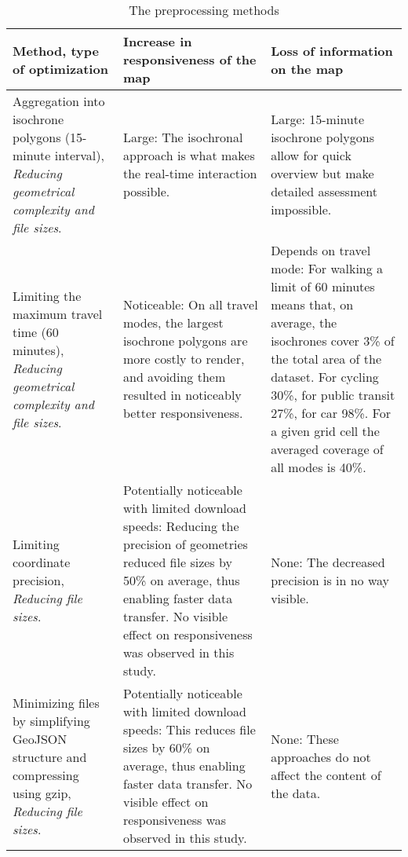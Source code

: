 \begin{table}[H]
	\caption{The preprocessing methods}
	\label{tab:preprocessing methods}
	\centering
	\begin{tabular}{ | L{0.25\textwidth} | L{0.33\textwidth} | L{0.33\textwidth} | }
		\hline
		\textbf{Method, type of optimization}
		& \textbf{Increase in responsiveness of the map}
		& \textbf{Loss of information on the map}
		\\
		\hline
		\hline
		Aggregation into isochrone polygons (15-minute interval),
		\textit{Reducing geometrical complexity and file sizes}.
		& Large: The isochronal approach is what makes the real-time interaction possible.
		& Large: 15-minute isochrone polygons allow for quick overview but make detailed assessment impossible.
		\\
		\hline
		Limiting the maximum travel time (60 minutes),
		\textit{Reducing geometrical complexity and file sizes}.
		& Noticeable:
		On all travel modes, the largest isochrone polygons are more costly to render,
		and avoiding them resulted in noticeably better responsiveness.
		& Depends on travel mode:
		For walking a limit of 60 minutes means that, on average,
		the isochrones cover 3\% of the total area of the dataset.
		For cycling 30\%, for public transit 27\%, for car 98\%.
		For a given grid cell the averaged coverage of all modes is 40\%.
		\\
		\hline
		Limiting coordinate precision,
		\textit{Reducing file sizes}.
		& Potentially noticeable with limited download speeds:
		Reducing the precision of geometries reduced file sizes by 50\% on average,
		thus enabling faster data transfer.
		No visible effect on responsiveness was observed in this study.
		& None: The decreased precision is in no way visible.
		\\
		\hline
		Minimizing files by simplifying GeoJSON structure and compressing using gzip,
		\textit{Reducing file sizes}.
		& Potentially noticeable with limited download speeds:
		This reduces file sizes by 60\% on average,  %
		thus enabling faster data transfer.
		No visible effect on responsiveness was observed in this study.
		& None: These approaches do not affect the content of the data.
		\\
		\hline
	\end{tabular}
\end{table}
